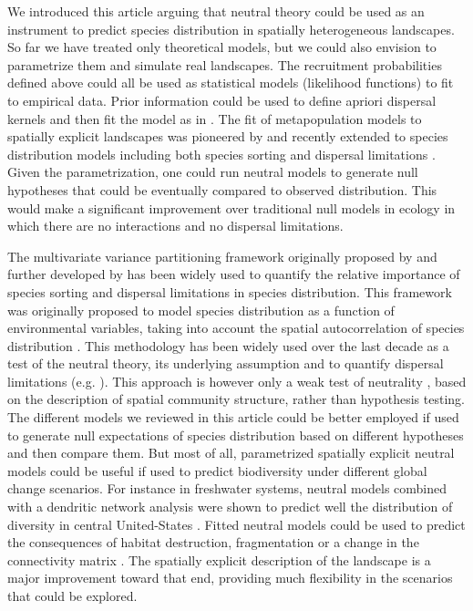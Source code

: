 \documentclass[12pt]{article}
\begin{document}
We introduced this article arguing that neutral theory could be used as an
instrument to predict species distribution in spatially heterogeneous
landscapes. So far we have treated only theoretical models, but we could also
envision to parametrize them and simulate real landscapes. The recruitment
probabilities defined above could all be used as statistical models (likelihood
functions) to fit to empirical data. Prior information could be used to define
apriori dispersal kernels and then fit the model as in \textcite{Gravel2008}.
The fit of metapopulation models to spatially explicit landscapes was pioneered
by \textcite{Hanski1998} and recently extended to species distribution models
including both species sorting and dispersal limitations
\parencite{Boulangeat2012}. Given the parametrization, one could run neutral
models to generate null hypotheses that could be eventually compared to observed
distribution. This would make a significant improvement over traditional null
models in ecology \parencite{Gotelli1996} in which there are no interactions and no dispersal
limitations.

The multivariate variance partitioning framework originally proposed by
\textcite{Borcard1992} and further developed by \textcite{Borcard2002} has been
widely used to quantify the relative importance of species sorting and dispersal
limitations in species distribution. This framework was originally proposed to
model species distribution as a function of environmental variables, taking into
account the spatial autocorrelation of species distribution
\parencite{Leduc1992, Borcard1992, Legendre1993}. This methodology has been
widely used over the last decade as a test of the neutral theory, its underlying
assumption and to quantify dispersal limitations (e.g. \textcite{Svenning2004,
Hardy2004, Gilbert2004, Cottenie2005}). This approach is however only a weak test
of neutrality \parencite{McGill2003}, based on the description of spatial
community structure, rather than hypothesis testing. The different models we
reviewed in this article could be better employed if used to generate null
expectations of species distribution based on different hypotheses and then
compare them. But most of all, parametrized spatially explicit neutral models
could be useful if used to predict biodiversity under different global change
scenarios. For instance in freshwater systems, neutral models combined with a
dendritic network analysis were shown to predict well the distribution of
diversity in central United-States \parencite{Muneepeerakul2008}. Fitted neutral
models could be used to predict the consequences of habitat destruction,
fragmentation or a change in the connectivity matrix \parencite{Hubbell2008}.
The spatially explicit description of the landscape is a major improvement
toward that end, providing much flexibility in the scenarios that could be
explored.
\end{document}
